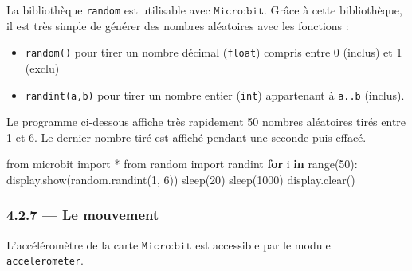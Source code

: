 \documentclass[a4paper,17pt]{extarticle}
\providecommand{\tightlist}{%
      \setlength{\itemsep}{0pt}\setlength{\parskip}{0pt}}
\newenvironment{Shaded}{}{}
\newcommand{\KeywordTok}[1]{\textcolor[rgb]{0.00,0.44,0.13}{\textbf{{#1}}}}
\newcommand{\DecValTok}[1]{\textcolor[rgb]{0.25,0.63,0.44}{{#1}}}
\newcommand{\NormalTok}[1]{{#1}}
\newcommand{\ImportTok}[1]{{#1}}
\newcommand{\ControlFlowTok}[1]{\textcolor[rgb]{0.00,0.44,0.13}{\textbf{{#1}}}}
\newcommand{\OperatorTok}[1]{\textcolor[rgb]{0.40,0.40,0.40}{{#1}}}
\newcommand{\BuiltInTok}[1]{{#1}}
\begin{document}
La bibliothèque \texttt{random} est utilisable avec
\(\texttt{Micro:bit}\). Grâce à cette bibliothèque, il est très simple
de générer des nombres aléatoires avec les fonctions :

\begin{itemize}
\tightlist
\item
  \texttt{random()} pour tirer un nombre décimal (\texttt{float})
  compris entre 0 (inclus) et 1 (exclu)
\item
  \texttt{randint(a,b)} pour tirer un nombre entier (\texttt{int})
  appartenant à \texttt{a..b} (inclus).
\end{itemize}
\begin{exemple}
    Le programme ci-dessous affiche très rapidement 50 nombres aléatoires
tirés entre 1 et 6. Le dernier nombre tiré est affiché pendant une
seconde puis effacé.

\begin{Shaded}
\begin{Highlighting}[]
\ImportTok{from}\NormalTok{ microbit }\ImportTok{import} \OperatorTok{*}
\ImportTok{from}\NormalTok{ random }\ImportTok{import}\NormalTok{ randint}
\ControlFlowTok{for}\NormalTok{ i }\KeywordTok{in} \BuiltInTok{range}\NormalTok{(}\DecValTok{50}\NormalTok{):}
\NormalTok{    display.show(random.randint(}\DecValTok{1}\NormalTok{, }\DecValTok{6}\NormalTok{))}
\NormalTok{    sleep(}\DecValTok{20}\NormalTok{)}
\NormalTok{sleep(}\DecValTok{1000}\NormalTok{)}
\NormalTok{display.clear()}
\end{Highlighting}
\end{Shaded}

        \end{exemple}
    \hypertarget{le-mouvement}{%
\subsubsection{4.2.7 --- Le mouvement}\label{le-mouvement}}

L'accéléromètre de la carte \(\texttt{Micro:bit}\) est accessible par le
module \texttt{accelerometer}.
\end{document}
